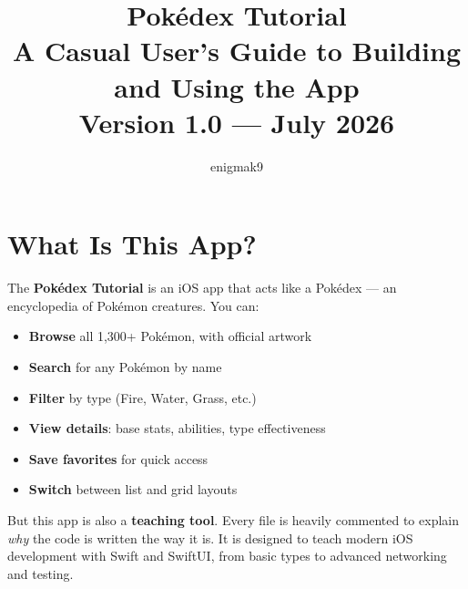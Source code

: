 \documentclass[11pt,a4paper]{article}
\title{
    \textbf{\Huge Pok\'{e}dex Tutorial}\\[4pt]
    \large A Casual User's Guide to Building and Using the App\\[8pt]
    \normalsize Version 1.0 — July 2026
}
\author{enigmak9}
\date{}
\newenvironment{tightitemize}
{\begin{itemize}\setlength{\itemsep}{2pt}\setlength{\parskip}{0pt}}
{\end{itemize}}
\begin{document}
\maketitle
\thispagestyle{fancy}

\begin{center}
\end{center}

\tableofcontents
\newpage

\section{What Is This App?}

The \textbf{Pok\'{e}dex Tutorial} is an iOS app that acts like a Pok\'{e}dex — an encyclopedia of Pok\'{e}mon creatures. You can:

\begin{tightitemize}
    \item \textbf{Browse} all 1,300+ Pok\'{e}mon, with official artwork
    \item \textbf{Search} for any Pok\'{e}mon by name
    \item \textbf{Filter} by type (Fire, Water, Grass, etc.)
    \item \textbf{View details}: base stats, abilities, type effectiveness
    \item \textbf{Save favorites} for quick access
    \item \textbf{Switch} between list and grid layouts
\end{tightitemize}

But this app is also a \textbf{teaching tool}. Every file is heavily commented to explain \textit{why} the code is written the way it is. It is designed to teach modern iOS development with Swift and SwiftUI, from basic types to advanced networking and testing.
\end{document}
